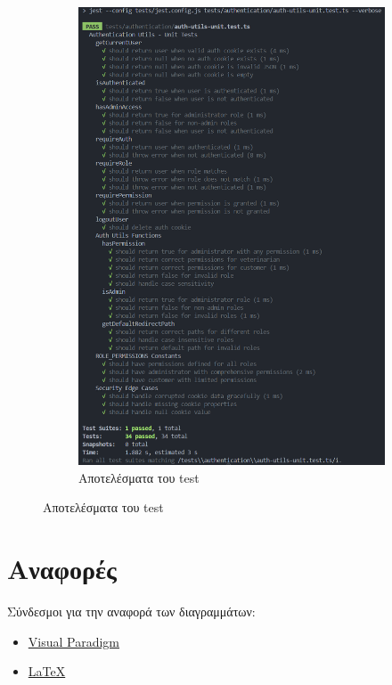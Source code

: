 \documentclass[12pt,a4paper,twoside]{book}
\begin{document}
\begin{figure}[H]
\begin{subfigure}[b]{0.48\textwidth}
        \includegraphics[width=\textwidth]{Resources/utils_test.png}
        \caption{Αποτελέσματα του test}\label{fig:test-results}
    \end{subfigure}
\end{figure}

\chapter{Αναφορές}

Σύνδεσμοι για την αναφορά των διαγραμμάτων: %
\begin{itemize}
    \item \href{https://www.visual-paradigm.com/}{Visual Paradigm}
    \item \href{https://www.latex-project.org/}{LaTeX}
\end{itemize}
\end{document}
